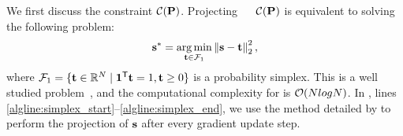 \documentclass[sigconf, anonymous, review]{acmart}
\begin{document}



We first discuss the constraint
$\mathcal{C}(\mathbf{{P}})$. Projecting~{\vects} ~{\vectt}  $\mathcal{C}(\mathbf{{P}})$ is equivalent to solving the following problem:
\begin{equation*}
    \mathbf{{s}}^{*}  =\underset {\mathbf{{t}} \in  \mathcal{F}_1}{\arg\min} \left\| \mathbf{{s}} - \mathbf{{t}} \right\|_2^2 ,
\end{equation*}
where $\mathcal{F}_{1} = \{ \mathbf{{t}} \in \mathbb{R}^{N} \mid \mathbf{1}^{\mathsf{T}}\mathbf{{t}} = 1, \mathbf{{t}} \geq 0\}$ is a probability simplex. This is a well studied problem~\citep{michelot1986finite, pardalos1990algorithm, duchi2008efficient, condat2016fast}, and the computational complexity for  \vectsopt is $\mathcal{O}(NlogN)$.
In , lines {\ref{algline:simplex_start}--\ref{algline:simplex_end}}, we use the method detailed by \citet{duchi2008efficient} to perform the projection of $\mathbf{{s}}$ after every gradient update step. 

\end{document}
